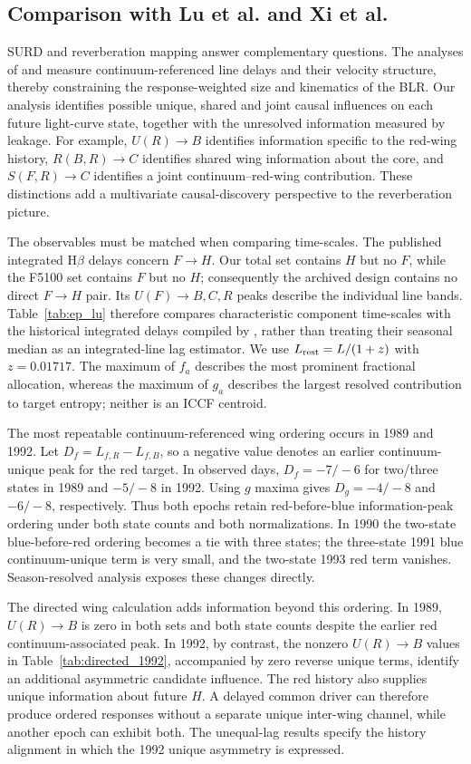 \documentclass[fleqn,usenatbib]{mnras}
\begin{document}
\subsection{Comparison with Lu et al. and Xi et al.}
\label{sec:comparison}
SURD and reverberation mapping answer complementary questions. The analyses of \citet{Lu2022} and \citet{Xi2025} measure continuum-referenced line delays and their velocity structure, thereby constraining the response-weighted size and kinematics of the BLR. Our analysis identifies possible unique, shared and joint causal influences on each future light-curve state, together with the unresolved information measured by leakage. For example, $U(R)\to B$ identifies information specific to the red-wing history, $R(B,R)\to C$ identifies shared wing information about the core, and $S(F,R)\to C$ identifies a joint continuum--red-wing contribution. These distinctions add a multivariate causal-discovery perspective to the reverberation picture.

The observables must be matched when comparing time-scales. The published integrated H$\beta$ delays concern $F\to H$. Our total set contains $H$ but no $F$, while the F5100 set contains $F$ but no $H$; consequently the archived design contains no direct $F\to H$ pair. Its $U(F)\to B,C,R$ peaks describe the individual line bands. Table~\ref{tab:ep_lu} therefore compares characteristic component time-scales with the historical integrated delays compiled by \citet{Lu2022}, rather than treating their seasonal median as an integrated-line lag estimator. We use $L_{\rm rest}=L/(1+z)$ with $z=0.01717$. The maximum of $f_a$ describes the most prominent fractional allocation, whereas the maximum of $g_a$ describes the largest resolved contribution to target entropy; neither is an ICCF centroid.

The most repeatable continuum-referenced wing ordering occurs in 1989 and 1992. Let $D_f=L_{f,R}-L_{f,B}$, so a negative value denotes an earlier continuum-unique peak for the red target. In observed days, $D_f=-7/-6$ for two/three states in 1989 and $-5/-8$ in 1992. Using $g$ maxima gives $D_g=-4/-8$ and $-6/-8$, respectively. Thus both epochs retain red-before-blue information-peak ordering under both state counts and both normalizations. In 1990 the two-state blue-before-red ordering becomes a tie with three states; the three-state 1991 blue continuum-unique term is very small, and the two-state 1993 red term vanishes. Season-resolved analysis exposes these changes directly.

The directed wing calculation adds information beyond this ordering. In 1989, $U(R)\to B$ is zero in both sets and both state counts despite the earlier red continuum-associated peak. In 1992, by contrast, the nonzero $U(R)\to B$ values in Table~\ref{tab:directed_1992}, accompanied by zero reverse unique terms, identify an additional asymmetric candidate influence. The red history also supplies unique information about future $H$. A delayed common driver can therefore produce ordered responses without a separate unique inter-wing channel, while another epoch can exhibit both. The unequal-lag results specify the history alignment in which the 1992 unique asymmetry is expressed.
\end{document}
